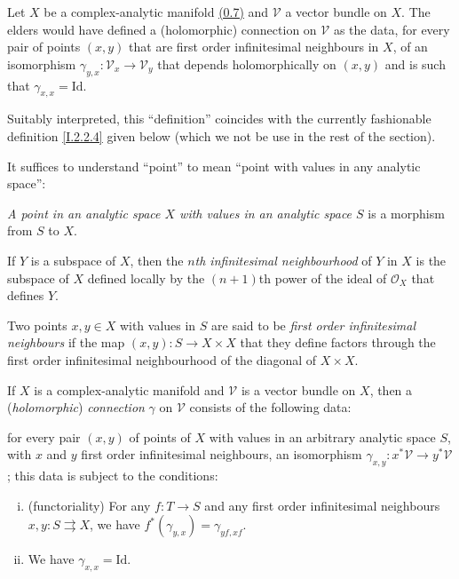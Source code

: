 \documentclass{report}
\theoremstyle{plain}
\theoremstyle{definition}
\newenvironment{env}[1]
    {\renewcommand\theinnercustomenv{#1}\innercustomenv}
    {\endinnercustomenv}
\newcommand{\sh}[1]{{\mathscr{#1}}}
\newcommand{\id}{\mathrm{Id}}
\newcommand{\oldpage}[1]{\marginpar{\footnotesize$\Big\vert$ \textit{p.~#1}}}
\begin{document}
\begin{env}{2.2}
\label{I.2.2}
  Let $X$ be a complex-analytic manifold \hyperref[0.7]{(0.7)} and $\sh{V}$ a vector bundle on $X$.
  The elders would have defined a (holomorphic) connection on $\sh{V}$ as the data, for every pair of points $(x,y)$ that are first order infinitesimal neighbours in $X$, of an isomorphism $\gamma_{y,x}\colon\sh{V}_x\to\sh{V}_y$ that depends holomorphically on $(x,y)$ and is such that $\gamma_{x,x}=\id$.

  Suitably interpreted, this ``definition'' coincides with the currently fashionable definition \cref{I.2.2.4} given below (which we not be use in the rest of the section).

  It suffices to understand ``point'' to mean ``point with values in any analytic space'':

\oldpage{6}
  \begin{env}{2.2.1}
  \label{I.2.2.1}
    \emph{A point in an analytic space $X$ with values in an analytic space $S$} is a morphism from $S$ to $X$.
  \end{env}

  \begin{env}{2.2.2}
  \label{I.2.2.2}
    If $Y$ is a subspace of $X$, then the \emph{$n$th infinitesimal neighbourhood} of $Y$ in $X$ is the subspace of $X$ defined locally by the $(n+1)$th power of the ideal of $\sh{O}_X$ that defines $Y$.
  \end{env}

  \begin{env}{2.2.3}
  \label{I.2.2.3}
    Two points $x,y\in X$ with values in $S$ are said to be \emph{first order infinitesimal neighbours} if the map $(x,y)\colon S\to X\times X$ that they define factors through the first order infinitesimal neighbourhood of the diagonal of $X\times X$.
  \end{env}

  \begin{env}{2.2.4}
  \label{I.2.2.4}
    If $X$ is a complex-analytic manifold and $\sh{V}$ is a vector bundle on $X$, then a (\emph{holomorphic}) \emph{connection} $\gamma$ on $\sh{V}$ consists of the following data:

    for every pair $(x,y)$ of points of $X$ with values in an arbitrary analytic space $S$, with $x$ and $y$ first order infinitesimal neighbours, an isomorphism $\gamma_{x,y}\colon x^*\sh{V}\to y^*\sh{V}$;
    this data is subject to the conditions:
    \begin{enumerate}[(i)]
      \item (functoriality) For any $f\colon T\to S$ and any first order infinitesimal neighbours $x,y\colon S\rightrightarrows X$, we have $f^*(\gamma_{y,x})=\gamma_{yf,xf}$.
      \item We have $\gamma_{x,x}=\id$.
    \end{enumerate}
  \end{env}
\end{env}
\end{document}

